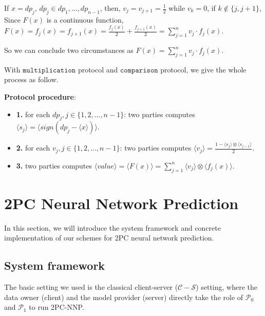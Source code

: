 \documentclass[letterpaper]{article} %
\begin{document}
       If $x=dp_{j} $, $ dp_{j}\in {dp_{1},...,dp_{n-1}}$,
       then, $v_{j}=v_{j+1}=\frac{1}{2}$ while $v_{k}=0$, if $ k\notin \{j,j+1\}$,
       Since $F(x)$ is a continuous function,
       $F(x)=f_{j}(x)=f_{j+1}(x)=\frac{f_{j}(x)}{2}+\frac{f_{j+1}(x)}{2}=\sum_{j=1}^{n}v_{j}\cdot f_{j}(x)$.
       
       So we can conclude two circumstances as $F(x)=\sum_{j=1}^{n}v_{j}\cdot f_{j}(x)$.  
       
       With $\mathtt{multiplication}$ protocol and $\mathtt{comparison}$ protocol, we give the whole process as follow.%
       
       
       \textbf{Protocol procedure}:
       
       \begin{itemize}
           \item \textbf{1.} 
           for each $dp_{j},j\in\{1,2,...,n-1\}$:
           two parties computes $\langle s_{j}\rangle=\langle sign(dp_{j}-\langle x\rangle)\rangle$.
       
           \item \textbf{2.}  
           for each $v_{j},j\in\{1,2,...,n-1\}$:
           two parties computes $\langle v_{j} \rangle= \frac{1-\langle s_{j}\rangle\otimes \langle s_{j-1}\rangle}{2}$.
       
           \item \textbf{3.}  
           two parties computes $\langle value\rangle=\langle F(x)\rangle=\sum_{j=1}^{n}\langle v_{j}\rangle\otimes \langle f_{j}(x)\rangle$.
       \end{itemize}
    
    
    \section{2PC Neural Network Prediction}
       In this section, we will introduce the system framework and concrete implementation of our 
       schemes for 2PC neural network prediction. 
       
    \subsection{System framework}
       The basic setting we used is the classical client-server ($\mathcal{C}-\mathcal{S}$) setting, 
       where the data owner (client) and the model provider (server)
       directly take the role of $\mathcal{P}_{0}$ and $\mathcal{P}_{1}$ to run 2PC-NNP.
\end{document}
